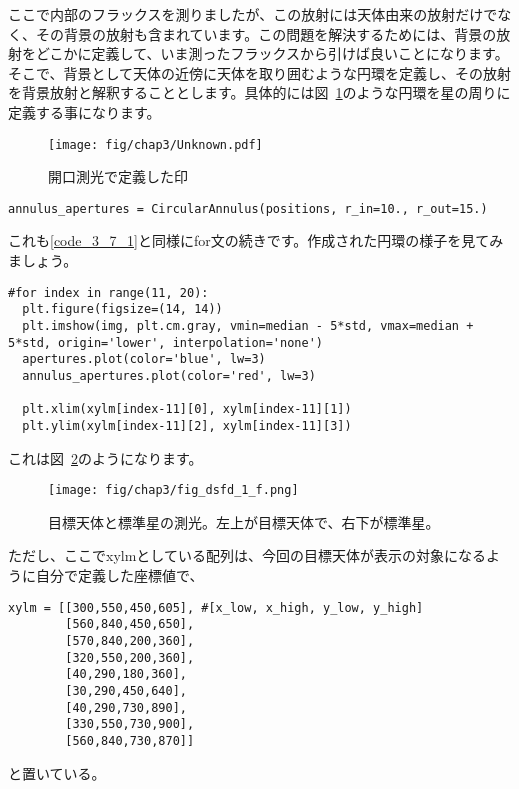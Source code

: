 ここで内部のフラックスを測りましたが、この放射には天体由来の放射だけでなく、その背景の放射も含まれています。この問題を解決するためには、背景の放射をどこかに定義して、いま測ったフラックスから引けば良いことになります。そこで、背景として天体の近傍に天体を取り囲むような円環を定義し、その放射を背景放射と解釈することとします。具体的には図~\ref{fig_3_11}のような円環を星の周りに定義する事になります。
\begin{figure}
  \centering
  \texttt{[image: fig/chap3/Unknown.pdf]}
  \caption[開口測光で定義した印]{開口測光で定義した印\label{fig_3_11}}
\end{figure}
\begin{lstlisting}[caption=開口測光の背景放射の定義,label=code_3_7_2]
  annulus_apertures = CircularAnnulus(positions, r_in=10., r_out=15.)
\end{lstlisting}
これも\ref{code_3_7_1}と同様にfor文の続きです。作成された円環の様子を見てみましょう。
\begin{lstlisting}[caption=開口測光で作成した円環の様子,label=code_3_7_3]
#for index in range(11, 20):
  plt.figure(figsize=(14, 14))
  plt.imshow(img, plt.cm.gray, vmin=median - 5*std, vmax=median + 5*std, origin='lower', interpolation='none')
  apertures.plot(color='blue', lw=3)
  annulus_apertures.plot(color='red', lw=3)

  plt.xlim(xylm[index-11][0], xylm[index-11][1])
  plt.ylim(xylm[index-11][2], xylm[index-11][3])
\end{lstlisting}
これは図~\ref{fig_3_12}のようになります。
\begin{figure}
  \centering
  \texttt{[image: fig/chap3/fig\_dsfd\_1\_f.png]}
  \caption[目標天体と標準星の測光]{目標天体と標準星の測光。左上が目標天体で、右下が標準星。\label{fig_3_12}}
\end{figure}

ただし、ここでxylmとしている配列は、今回の目標天体が表示の対象になるように自分で定義した座標値で、
\begin{screen}
\begin{verbatim}
xylm = [[300,550,450,605], #[x_low, x_high, y_low, y_high]
        [560,840,450,650],
        [570,840,200,360],
        [320,550,200,360],
        [40,290,180,360],
        [30,290,450,640],
        [40,290,730,890],
        [330,550,730,900],
        [560,840,730,870]]\end{verbatim}
\end{screen}
と置いている。

